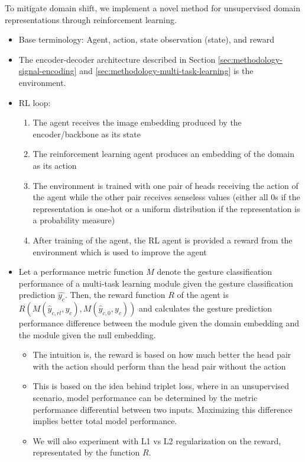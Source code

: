 To mitigate domain shift, we implement a novel method for unsupervised domain representations through reinforcement learning.

\begin{itemize}
	\item Base terminology: Agent, action, state observation (state), and reward
	\item The encoder-decoder architecture described in Section \ref{sec:methodology-signal-encoding} and \ref{sec:methodology-multi-task-learning} is the environment.
	\item RL loop:
	\begin{enumerate}
		\item The agent receives the image embedding produced by the encoder/backbone as its state
		\item The reinforcement learning agent produces an embedding of the domain as its action
		\item The environment is trained with one pair of heads receiving the action of the agent while the other pair receives senseless values (either all 0s if the representation is one-hot or a uniform distribution if the representation is a probability measure)
		\item After training of the agent, the RL agent is provided a reward from the environment which is used to improve the agent
	\end{enumerate}
	\item Let a performance metric function $M$ denote the gesture classification performance of a multi-task learning module given the gesture classification prediction $\hat{y_{c}}$. Then, the reward function $R$ of the agent is $R\left(M\left(\hat{y}_{c,rl}, y_c\right),M\left(\hat{y}_{c,0}, y_c\right)\right)$ and calculates the gesture prediction performance difference between the module given the domain embedding and the module given the null embedding.
	\begin{itemize}
		\item The intuition is, the reward is based on how much better the head pair with the action should perform than the head pair without the action
		\item This is based on the idea behind triplet loss, where in an unsupervised scenario, model performance can be determined by the metric performance differential between two inputs. Maximizing this difference implies better total model performance.
		\item We will also experiment with L1 vs L2 regularization on the reward, representated by the function $R$.

\end{itemize}
\end{itemize}
